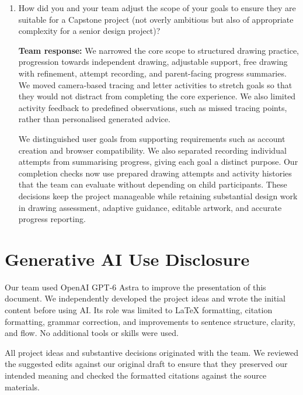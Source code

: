 \documentclass{article}
\begin{document}
\begin{enumerate}
\item How did you and your team adjust the scope of your goals to ensure they
are suitable for a Capstone project (not overly ambitious but also of
appropriate complexity for a senior design project)?

\textbf{Team response:} We narrowed the core scope to structured drawing
practice, progression towards independent drawing, adjustable support, free
drawing with refinement, attempt recording, and parent-facing progress
summaries. We moved camera-based tracing and letter activities to stretch goals
so that they would not distract from completing the core experience. We also
limited activity feedback to predefined observations, such as missed tracing
points, rather than personalised generated advice.

We distinguished user goals from supporting requirements such as account
creation and browser compatibility. We also separated recording individual
attempts from summarising progress, giving each goal a distinct purpose. Our
completion checks now use prepared drawing attempts and activity histories that
the team can evaluate without depending on child participants. These decisions
keep the project manageable while retaining substantial design work in drawing
assessment, adaptive guidance, editable artwork, and accurate progress
reporting.

\end{enumerate}

\section*{Generative AI Use Disclosure}

Our team used OpenAI GPT-6 Astra to improve the presentation of this document.
We independently developed the project ideas and wrote the initial content
before using AI. Its role was limited to \LaTeX{} formatting, citation
formatting, grammar correction, and improvements to sentence structure,
clarity, and flow. No additional tools or skills were used.

All project ideas and substantive decisions originated with the team. We
reviewed the suggested edits against our original draft to ensure that they
preserved our intended meaning and checked the formatted citations against the
source materials.

\clearpage


\end{document}
